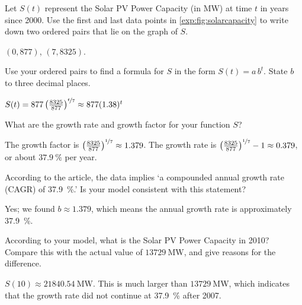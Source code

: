 \begin{exercises}
\begin{problem}
\begin{subproblem}
	Let $S(t)$ represent the Solar PV Power Capacity (in \si{\mega\watt}) at time $t$ in years 
	since 2000. Use the first and last data points in \cref{exp:fig:solarcapacity} to 
	write down two ordered pairs that lie on the graph of $S$.
	\begin{shortsolution}
		$(0,877)$, $(7,8325)$.
	\end{shortsolution}
\end{subproblem}
\begin{subproblem}
	Use your ordered pairs to find a formula for $S$ in the form $S(t)=a\,b^t$. State $b$ to 
	three decimal places.
	\begin{shortsolution}
		$S(t)=877\left( \frac{8325}{877} \right)^{\nicefrac{t}{7}}\approx 877(1.38)^t$
	\end{shortsolution}
\end{subproblem}
\begin{subproblem}
	What are the growth rate and growth factor for your function $S$?
	\begin{shortsolution}  
		The growth factor is $\left( \frac{8325}{877} \right)^{\nicefrac{1}{7}}\approx 1.379$. 
		The growth rate is $\left( \frac{8325}{877} \right)^{\nicefrac{1}{7}}-1 \approx 0.379$, or about $\SI{37.9}{\percent}$ per year.
	\end{shortsolution}
\end{subproblem}
\begin{subproblem}
	According to the article, the data implies `a compounded annual growth rate (CAGR) of \SI{37.9}{\percent}.'     
	Is your model consistent with this statement?
	\begin{shortsolution}
		Yes; we found $b\approx 1.379$, which means the annual growth rate is approximately \SI{37.9}{\percent}.  
	\end{shortsolution}
\end{subproblem}
\begin{subproblem}
	According to your model, what is the Solar PV Power Capacity in 2010? Compare this 
	with the actual value of  $\SI{13729}{\mega\watt}$, and give reasons for the difference.
	\begin{shortsolution}
		$S(10)\approx \SI{21840.54}{\mega\watt}$. 
		This is much larger than $\SI{13729 }{\mega\watt}$, which indicates that the 
		growth rate did not continue at \SI{37.9}{\percent} after 2007.
	\end{shortsolution}
\end{subproblem}
\end{problem}
\end{exercises}
			
